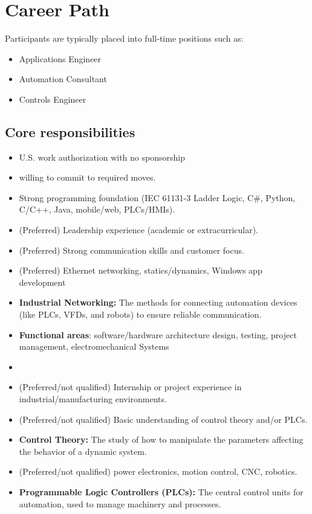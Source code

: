 \documentclass[11pt]{article}
\begin{document}
\section*{Career Path}
Participants are typically placed into full-time positions such as:
\begin{itemize}
  \item Applications Engineer
  \item Automation Consultant
  \item Controls Engineer
\end{itemize}

\newpage
\subsection*{Core responsibilities}
\begin{itemize}
  \item U.S. work authorization with no sponsorship
  \item willing to commit to required moves.
  \item Strong programming foundation (IEC 61131-3 Ladder Logic, C\#, Python, C/C++, Java, mobile/web, PLCs/HMIs).
  \item (Preferred) Leadership experience (academic or extracurricular).
  \item (Preferred) Strong communication skills and customer focus.
  \item (Preferred) Ethernet networking, statics/dynamics, Windows app development
  \item \textbf{Industrial Networking:} The methods for connecting automation devices (like PLCs, VFDs, and robots) to ensure reliable communication.
  \item \textbf{Functional areas}: software/hardware architecture design, testing, project management, electromechanical Systems
  \item \hrulefill
  \item (Preferred/not qualified) Internship or project experience in industrial/manufacturing environments.
  \item (Preferred/not qualified) Basic understanding of control theory and/or PLCs.
  \item \textbf{Control Theory:} The study of how to manipulate the parameters affecting the behavior of a dynamic system.
  \item (Preferred/not qualified) power electronics, motion control, CNC, robotics.
  \item \textbf{Programmable Logic Controllers (PLCs):} The central control units for automation, used to manage machinery and processes.

\end{itemize}
\end{document}
